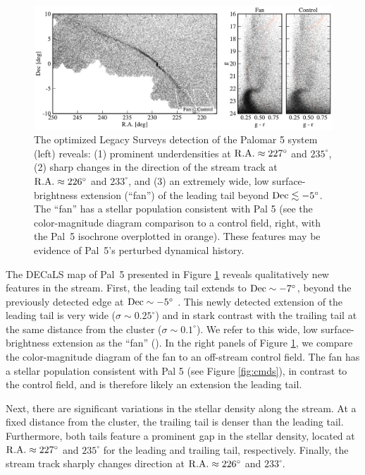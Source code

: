 \documentclass[twocolumn]{aastex62}
\newcommand{\sa}[1]{{\color{magenta} SP: #1}}
\begin{document}
\begin{figure}
\begin{center}
\includegraphics[width=\textwidth]{map_fancmd.pdf}
\end{center}
\caption{
The optimized Legacy Surveys detection of the Palomar 5 system (left) reveals: (1) prominent underdensities at $\rm R.A.\approx 227^\circ$ and $235^\circ$, (2) sharp changes in the direction of the stream track at $\rm R.A.\approx 226^\circ$ and $233^\circ$, and (3) an extremely wide, low surface-brightness extension (``fan'') of the leading tail beyond $\rm Dec\lesssim-5^\circ$.
The ``fan''  has a stellar population consistent with Pal 5 (see the color-magnitude diagram comparison to a control field, right, with the Pal~5 isochrone overplotted in orange).
These features may be evidence of Pal~5's perturbed dynamical history.
}
\label{fig:map}
\end{figure}

The DECaLS map of Pal~5 presented in Figure \ref{fig:map} reveals qualitatively new features in the stream.
First, the leading tail extends to $\rm Dec\sim-7^\circ$, beyond the previously detected edge at $\rm Dec\sim -5^\circ$ \citep{Bernard:2016}.
This newly detected extension of the leading tail is very wide ($\sigma\sim 0.25^\circ$) and in stark contrast with the trailing tail at the same distance from the cluster ($\sigma\sim 0.1^\circ$). We refer to this wide, low surface-brightness extension as the ``fan'' (\citealt{Pearson:2015}).
In the right panels of Figure \ref{fig:map}, we compare the color-magnitude diagram of the fan to an off-stream control field.
The fan has a stellar population consistent with Pal 5 (see Figure \ref{fig:cmds}), in contrast to the control field, and is therefore likely an extension the leading tail.

Next, there are significant variations in the stellar density along the stream.
At a fixed distance from the cluster, the trailing tail is denser than the leading tail.
Furthermore, both tails feature a prominent gap in the stellar density, located at $\rm R.A.\approx 227^\circ$ and $235^\circ$ for the leading and trailing tail, respectively.
Finally, the stream track sharply changes direction at $\rm R.A.\approx 226^\circ$ and $233^\circ$.
\end{document}
